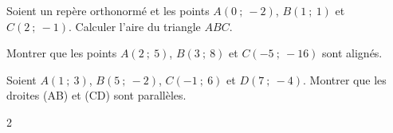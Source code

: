 \documentclass[main.tex]{subfiles}
\begin{document}
\vfill 
\begin{example}
Soient un repère orthonormé et les points $A(0~;~-2)$, $B(1~;~1)$ et $C(2~;~-1)$. Calculer l'aire du triangle $ABC$.
\end{example}
\vfill 
\begin{example}
Montrer que les points $A(2~;~5)$, $B(3~;~8)$ et $C(-5~;~-16)$ sont alignés.
\end{example}
\vfill 

\newpage
\begin{example}
Soient $A(1~;~3)$, $B(5~;~-2)$, $C(-1~;~6)$ et $D(7~;~-4)$. 
Montrer que les droites (AB) et (CD) sont parallèles.
\end{example}
\vfill 


\begin{multicols}{2} 
\begin{exercise}



\end{exercise}
\end{multicols}
\end{document}
